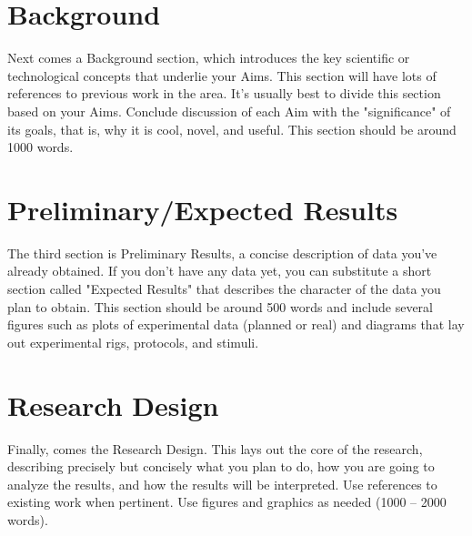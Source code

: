 \documentclass[12pt]{article}
\begin{document}
\section{Background}
Next comes a Background section, which introduces the key scientific or technological concepts that underlie your Aims. 
This section will have lots of references to previous work in the area. 
It's usually best to divide this section based on your Aims. 
Conclude discussion of each Aim with the "significance" of its goals, that is, why it is cool, novel, and useful. 
This section should be around 1000 words.

\section{Preliminary/Expected Results}
The third section is Preliminary Results, a concise description of data you've already obtained. 
If you don't have any data yet, you can substitute a short section called "Expected Results" that describes the character of the data you plan to obtain. 
This section should be around 500 words and include several figures such as plots of experimental data (planned or real) and diagrams that lay out experimental rigs, protocols, and stimuli.

\section{Research Design}
Finally, comes the Research Design. 
This lays out the core of the research, describing precisely but concisely what you plan to do, how you are going to analyze the results, and how the results will be interpreted. 
Use references to existing work when pertinent. 
Use figures and graphics as needed (1000 – 2000 words).


\end{document}
